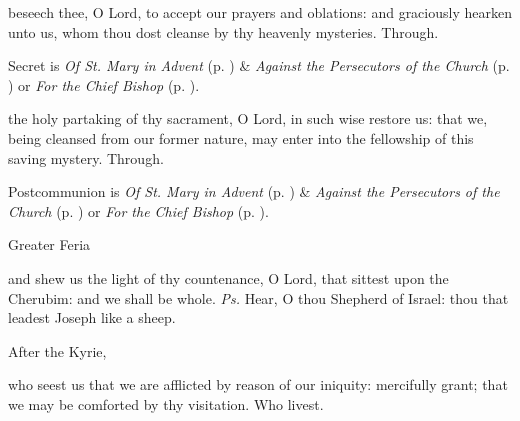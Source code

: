 \secret
{} beseech thee, O Lord, to accept our prayers and oblations: and graciously hearken unto us, whom thou dost cleanse by thy heavenly mysteries. Through.
\begin{rubric}
     Secret is \emph{Of St. Mary in Advent} (p. \pageref{SPMaryInAdvent}) \&  \emph{Against the Persecutors of the Church} (p. \pageref{SPAgainst}) or \emph{For the Chief Bishop} (p. \pageref{SPChiefBishop}).
\end{rubric}
\postcommunion
{} the holy partaking of thy sacrament, O Lord, in such wise restore us: that we, being cleansed from our former nature, may enter into the fellowship of this saving mystery. Through.
\begin{rubric}
     Postcommunion is \emph{Of St. Mary in Advent} (p. \pageref{SPMaryInAdvent}) \&  \emph{Against the Persecutors of the Church} (p. \pageref{SPAgainst}) or \emph{For the Chief Bishop} (p. \pageref{SPChiefBishop}).
\end{rubric}

\clearpage

\begin{inhead}
{Greater Feria}
\end{inhead}
\par\noindent
{}

\properantiphonfix

\introit
{} and shew us the light of thy countenance, O Lord, that sittest upon the Cherubim: and we shall be whole. \textit{Ps.} Hear, O thou Shepherd of Israel: thou that leadest Joseph like a sheep.
\begin{rubric}
    After the Kyrie,
\end{rubric}
\collect
{} who seest us that we are afflicted by reason of our iniquity: mercifully grant; that we may be comforted by thy visitation. Who livest.

